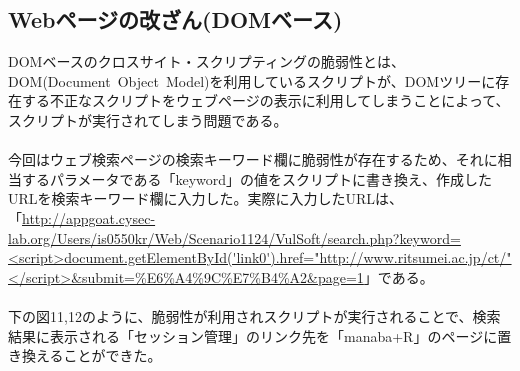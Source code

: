 \documentclass[dvipdfmx,autodetect-engine,titlepage]{jsarticle}
\begin{document}
\subsection{Webページの改ざん(DOMベース)}
DOMベースのクロスサイト・スクリプティングの脆弱性とは、DOM(Document Object Model)を利用しているスクリプトが、DOMツリーに存在する不正なスクリプトをウェブページの表示に利用してしまうことによって、スクリプトが実行されてしまう問題である。\\\\
今回はウェブ検索ページの検索キーワード欄に脆弱性が存在するため、それに相当するパラメータである「keyword」の値をスクリプトに書き換え、作成したURLを検索キーワード欄に入力した。実際に入力したURLは、「\url{http://appgoat.cysec-lab.org/Users/is0550kr/Web/Scenario1124/VulSoft/search.php?keyword=<script>document.getElementById('link0').href="http://www.ritsumei.ac.jp/ct/"</script>&submit=%E6%A4%9C%E7%B4%A2&page=1}」である。\\\\
下の図11,12のように、脆弱性が利用されスクリプトが実行されることで、検索結果に表示される「セッション管理」のリンク先を「manaba+R」のページに置き換えることができた。\\
\end{document}
